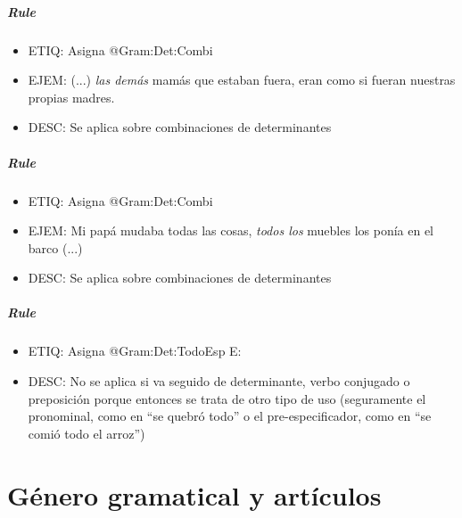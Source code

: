 \documentclass[11pt]{report}
\begin{document}
\paragraph*{Rule}
\begin{itemize}
\item ETIQ: Asigna @Gram:Det:Combi
\item EJEM: (...) \emph{las demás} mamás que estaban fuera, eran como si fueran nuestras propias madres.
\item DESC: Se aplica sobre combinaciones de determinantes
\end{itemize}

\paragraph*{Rule}
\begin{itemize}
\item ETIQ: Asigna @Gram:Det:Combi
\item EJEM: Mi papá mudaba todas las cosas, \emph{todos los} muebles los ponía en el barco (...)
\item DESC: Se aplica sobre combinaciones de determinantes
\end{itemize}

\paragraph*{Rule}
\begin{itemize}
\item ETIQ: Asigna @Gram:Det:TodoEsp
 E: 
\item DESC: No se aplica si va seguido de determinante, verbo conjugado o preposición porque entonces se trata de otro tipo de uso (seguramente el pronominal, como en ``se quebró todo'' o el pre-especificador, como en ``se comió todo el arroz'')
\end{itemize}

\chapter{Género gramatical y artículos}
\end{document}
